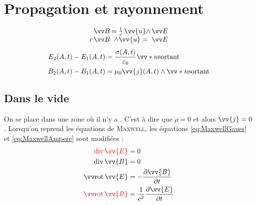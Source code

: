 \documentclass[11pt,a4paper,fleqn,pdftex]{report}
\begin{document}
\section{Propagation et rayonnement}
\begin{methode}
  \[
  \begin{array}{r@{$\,$}c@{$\,$}c@{$\,$}l}
    &\B& = \frac{1}{c}\, \vv{u}\wedge &\E \\
    c&\B&\wedge \vv{u} = & \E
  \end{array}
  \]
  \begin{align*}
    E_2(A,t) - E_1(A,t) &= \dfrac{\sigma (A,t)}{\varepsilon_0} \vv*{n}{\text{sortant}}\\
    B_2(A,t) - B_1(A,t) &= \mu_0 \vv{j}(A,t) \wedge \vv*{n}{\text{sortant}}
  \end{align*}
\end{methode}
\subsection{Dans le vide}
On se place dans une zone où il n'y a . C'est à dire que $\rho = 0$ et alors $\vv{j} = 0$. Lorsqu'on reprend les équations de \textsc{Maxwell}, les équations \eqref{eq:MaxwellGauss} et \eqref{eq:MaxwellAmpere} sont modifiées : 
\begin{align*}
\textcolor{couleurImp}{\diverg \vv{E}}&=0\\
\diverg \vv{B}&=0\\
\rot \vv{E}&=-\dfrac{\partial\vv{B}}{\partial t}\\
\textcolor{couleurImp}{\rot \vv{B}}&=\frac{1}{c^2} \dfrac{\partial\vv{E}}{\partial t}
\end{align*}
\end{document}
